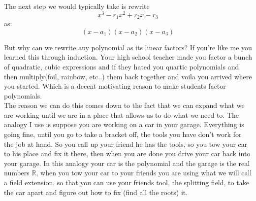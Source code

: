 \documentclass[12pt]{article}
\begin{document}
The next step we would typically take is rewrite 
$$x^3 -r_1 x^2 +r_2 x - r_3$$ 
as: 
$$(x-a_1)(x-a_2)(x-a_3)$$  

But why can we rewrite any polynomial as its linear factors?  If you're like me you learned this through induction.  Your high school teacher made you factor a bunch of quadratic, cubic expressions and if they hated you quartic polynomials and then multiply(foil, rainbow, etc..) them back together and voila you arrived where you started.  Which is a decent motivating reason to make students factor polynomials.\\

The reason we can do this comes down to the fact that we can expand what we are working until we are in a place that allows us to do what we need to.  The analogy I use is suppose you are working on a car in your garage.  Everything is going fine, until you go to take a bracket off, the tools you have don't work for the job at hand.  So you call up your friend he has the tools, so you tow your car to his place and fix it there, then when you are done you drive your car back into your garage.  In this analogy your car is the polynomial and the garage is the real numbers $\mathbb{R}$, when you tow your car to your friends you are using what we will call a field extension, so that you can use your friends tool, the splitting field, to take the car apart and figure out how to fix (find all the roots) it.
\end{document}
